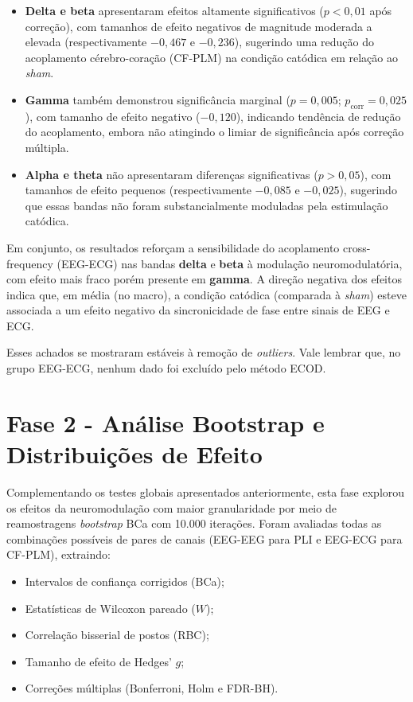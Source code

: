 \begin{itemize}
  \item \textbf{Delta e beta} apresentaram efeitos altamente significativos ($p < 0{,}01$ após correção), com tamanhos de efeito negativos de magnitude moderada a elevada (respectivamente $-0{,}467$ e $-0{,}236$), sugerindo uma redução do acoplamento cérebro-coração (CF-PLM) na condição catódica em relação ao \textit{sham}.
  \item \textbf{Gamma} também demonstrou significância marginal ($p = 0{,}005$; $p_{\text{corr}} = 0{,}025$), com tamanho de efeito negativo ($-0{,}120$), indicando tendência de redução do acoplamento, embora não atingindo o limiar de significância após correção múltipla.
  \item \textbf{Alpha e theta} não apresentaram diferenças significativas ($p > 0{,}05$), com tamanhos de efeito pequenos (respectivamente $-0{,}085$ e $-0{,}025$), sugerindo que essas bandas não foram substancialmente moduladas pela estimulação catódica.
\end{itemize}

Em conjunto, os resultados reforçam a sensibilidade do acoplamento cross-frequency (EEG-ECG) nas bandas \textbf{delta} e \textbf{beta} à modulação neuromodulatória, com efeito mais fraco porém presente em \textbf{gamma}. A direção negativa dos efeitos indica que, em média (no macro), a condição catódica (comparada à \textit{sham}) esteve associada a um efeito negativo da sincronicidade de fase entre sinais de EEG e ECG.

Esses achados se mostraram estáveis à remoção de \textit{outliers}. Vale lembrar que, no grupo EEG-ECG, nenhum dado foi excluído pelo método ECOD.

\section{Fase 2 - Análise Bootstrap e Distribuições de Efeito}

Complementando os testes globais apresentados anteriormente, esta fase explorou os efeitos da neuromodulação com maior granularidade por meio de reamostragens \textit{bootstrap} BCa com 10.000 iterações. Foram avaliadas todas as combinações possíveis de pares de canais (EEG-EEG para PLI e EEG-ECG para CF-PLM), extraindo:
\begin{itemize}
  \item Intervalos de confiança corrigidos (BCa);
  \item Estatísticas de Wilcoxon pareado ($W$);
  \item Correlação bisserial de postos (RBC);
  \item Tamanho de efeito de Hedges' $g$;
  \item Correções múltiplas (Bonferroni, Holm e FDR-BH).
\end{itemize}

